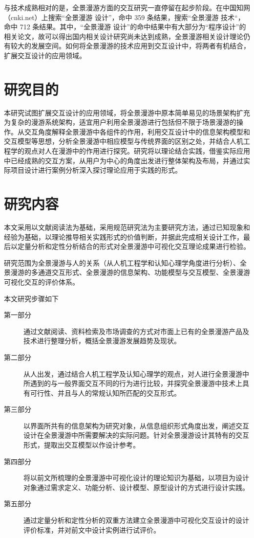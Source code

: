 与技术成熟相对的是，全景漫游方面的交互研究一直停留在起步阶段。在中国知网（cnki.net）上搜索“全景漫游 设计”，命中 359 条结果，搜索“全景漫游 技术“，命中 712 条结果。其中，“全景漫游 设计”的命中结果中有大部分为“程序设计”的相关论文，故可以得出国内相关设计研究尚未达到成熟，全景漫游相关设计理论仍有较大的发展空间。如何将全景漫游的技术应用到交互设计中，将两者有机结合，扩展交互设计的应用领域。

\section{研究目的}
本研究试图扩展交互设计的应用领域，将全景漫游中原本简单易见的场景架构扩充为复杂的漫游系统架构，适宜用户利用全景漫游进行包括但不限于场景漫游的操作。从交互角度解释全景漫游中各组件的作用，利用交互设计中的信息架构模型和交互模型等思想，分析全景漫游中相应模型与传统界面的区别之处，并结合人机工程学的观点对人在漫游中的作用进行探究。研究将以理论结合实践，借鉴实际应用中已经成熟的交互方案，从用户为中心的角度出发进行整体架构及布局，并通过实际项目设计进行案例分析深入探讨理论应用于实践的形式。

\section{研究内容}
本文采用以文献阅读法为基础，采用规范研究法为主要研究方法，通过已知现象和经验为基础，以理论推导相关实践形式的价值判断，并据此完成相关设计工作，最后以定量分析和定性分析结合的形式对全景漫游中可视化交互理论成果进行检验。

研究范围为全景漫游与人的关系（从人机工程学和认知心理学角度进行分析）、全景漫游的多通道交互形式、全景漫游的信息架构、功能模型与交互模型、全景漫游可视化交互的评价体系。

本文研究步骤如下

\begin{description}
\item[第一部分] 通过文献阅读、资料检索及市场调查的方式对市面上已有的全景漫游产品及技术进行整理分析，概括全景漫游发展趋势及现状。

\item[第二部分] 从人出发，通过结合人机工程学及认知心理学的观点，对人进行全景漫游中所遇到的与一般界面交互不同的行为进行比较，并探究全景漫游中技术上具有可行性、并且与人的常规认知所匹配的交互形式。

\item[第三部分] 以界面所共有的信息架构为研究对象，从信息组织形式角度出发，阐述交互设计在全景漫游中所需要解决的实际问题。针对全景漫游设计其特有的交互形式，提取出交互模型以作设计参考。

\item[第四部分] 将以前文所梳理的全景漫游中可视化设计的理论知识为基础，以项目为设计对象通过需求定义、功能分析、设计模型、原型设计的方式进行设计实践。

\item[第五部分] 通过定量分析和定性分析的双重方法建立全景漫游中可视化交互设计的设计评价标准，并对前文中设计实例进行试评价。

\end{description}

